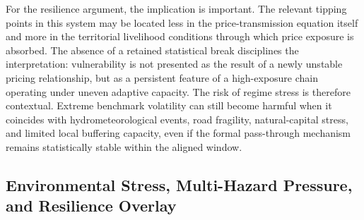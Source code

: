 \documentclass[11pt]{article}
\begin{document}
For the resilience argument, the implication is important. The relevant tipping points in this system may be located less in the price-transmission equation itself and more in the territorial livelihood conditions through which price exposure is absorbed. The absence of a retained statistical break disciplines the interpretation: vulnerability is not presented as the result of a newly unstable pricing relationship, but as a persistent feature of a high-exposure chain operating under uneven adaptive capacity. The risk of regime stress is therefore contextual. Extreme benchmark volatility can still become harmful when it coincides with hydrometeorological events, road fragility, natural-capital stress, and limited local buffering capacity, even if the formal pass-through mechanism remains statistically stable within the aligned window.
\begin{table}[H]
\centering
\caption{Bai-Perron structural-break diagnostic for core Colombian return transmission}
\label{tab:structural_breaks}
\small
{}
\caption*{\footnotesize Note: Lower BIC values indicate preferred specifications \citep{BaiPerron2003}. The May 2024 candidate identifies a potential attenuation of pass-through during the peak-price period, but the no-break model remains the statistically superior description of the sample. This confirms the persistence of the high-exposure regime.}
\end{table}

\subsection{Environmental Stress, Multi-Hazard Pressure, and Resilience Overlay}
\label{sec:environmental_stress}
\end{document}
